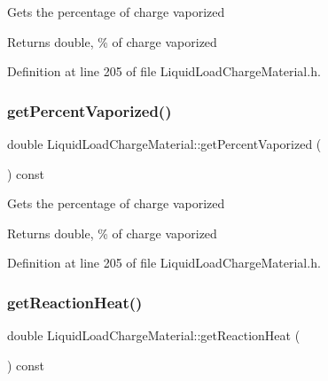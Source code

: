 Gets the percentage of charge vaporized \begin{DoxyReturn}{Returns}
double, \% of charge vaporized 
\end{DoxyReturn}


Definition at line 205 of file Liquid\+Load\+Charge\+Material.\+h.

\mbox{\label{class_liquid_load_charge_material_a8e55b0df0a0551671636bcf169228dca}} 
\subsubsection{\texorpdfstring{get\+Percent\+Vaporized()}{getPercentVaporized()}\hspace{0.1cm}{\footnotesize\ttfamily [3/3]}}
{\footnotesize\ttfamily double Liquid\+Load\+Charge\+Material\+::get\+Percent\+Vaporized (\begin{DoxyParamCaption}{ }\end{DoxyParamCaption}) const\hspace{0.3cm}{\ttfamily [inline]}}

Gets the percentage of charge vaporized \begin{DoxyReturn}{Returns}
double, \% of charge vaporized 
\end{DoxyReturn}


Definition at line 205 of file Liquid\+Load\+Charge\+Material.\+h.

\mbox{\label{class_liquid_load_charge_material_a2f0c26e789e98efd1e8fd0c8741ddd92}} 
\subsubsection{\texorpdfstring{get\+Reaction\+Heat()}{getReactionHeat()}\hspace{0.1cm}{\footnotesize\ttfamily [1/3]}}
{\footnotesize\ttfamily double Liquid\+Load\+Charge\+Material\+::get\+Reaction\+Heat (\begin{DoxyParamCaption}{ }\end{DoxyParamCaption}) const\hspace{0.3cm}{\ttfamily [inline]}}


